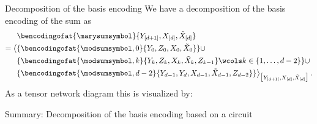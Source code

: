 \documentclass{beamer}
\begin{document}
    \begin{frame}{Decomposition of the basis encoding}
        We have a decomposition of the basis encoding of the sum as
        \begin{align*}
            &\bencodingofat{\marysumsymbol}{\headvariableof{[\catorder+1]},\shortcatvariables,\tildecatvariableof{[\catorder]}} \\
            = \breakablecontractionof{
                &\{\bencodingofat{\modsumsymbol,0}{\headvariableof{0},\thirdcatvariableof{0},\catvariableof{0},\tildecatvariableof{0}}\} \cup \\
                &\{\bencodingofat{\modsumsymbol,\catenumerator}{
                    \headvariableof{\catenumerator},\thirdcatvariableof{\catenumerator},\catvariableof{\catenumerator},\tildecatvariableof{\catenumerator},\thirdcatvariableof{\catenumerator-1}
                }\wcols \catenumerator\in\{1,\ldots,\catorder-2\}\} \cup \\
                &\{\bencodingofat{\modsumsymbol,\catorder-2}{\headvariableof{\catorder-1},\headvariableof{\catorder},\catvariableof{\catorder-1},\tildecatvariableof{\catorder-1},\thirdcatvariableof{\catorder-2}}\}
            }{\headvariableof{[\catorder+1]},\shortcatvariables,\tildecatvariableof{[\catorder]}} \, .
        \end{align*}
        As a tensor network diagram this is visualized by:
        
        
    \end{frame}

    \begin{frame}{Summary: Decomposition of the basis encoding based on a circuit}

        

    \end{frame}


%
%
\end{document}
